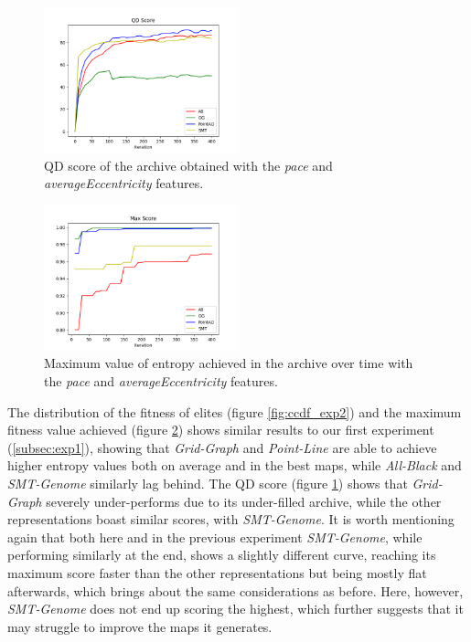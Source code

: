 \begin{figure}[H]
    \centering
    \includegraphics[width=0.5\textwidth]{images/Exp2/qd_score.png}
    \caption{QD score of the archive obtained with the \textit{pace} and \textit{averageEccentricity} features.}
    \label{fig:qd_score_exp2}
\end{figure}

\begin{figure}[H]
    \centering
    \includegraphics[width=0.5\textwidth]{images/Exp2/max_score.png}
    \caption{Maximum value of entropy achieved in the archive over time with the \textit{pace} and \textit{averageEccentricity} features.}
    \label{fig:max_score_exp2}
\end{figure}

The distribution of the fitness of elites (figure \ref{fig:ccdf_exp2}) and the maximum fitness value achieved (figure \ref{fig:max_score_exp2}) shows similar results to our first experiment (\ref{subsec:exp1}), showing that \textit{Grid-Graph} and \textit{Point-Line} are able to achieve higher entropy values both on average and in the best maps, while \textit{All-Black} and \textit{SMT-Genome} similarly lag behind. The QD score (figure \ref{fig:qd_score_exp2}) shows that \textit{Grid-Graph} severely under-performs due to its under-filled archive, while the other representations boast similar scores, with \textit{SMT-Genome}. It is worth mentioning again that both here and in the previous experiment \textit{SMT-Genome}, while performing similarly at the end, shows a slightly different curve, reaching its maximum score faster than the other representations but being mostly flat afterwards, which brings about the same considerations as before. Here, however, \textit{SMT-Genome} does not end up scoring the highest, which further suggests that it may struggle to improve the maps it generates.

